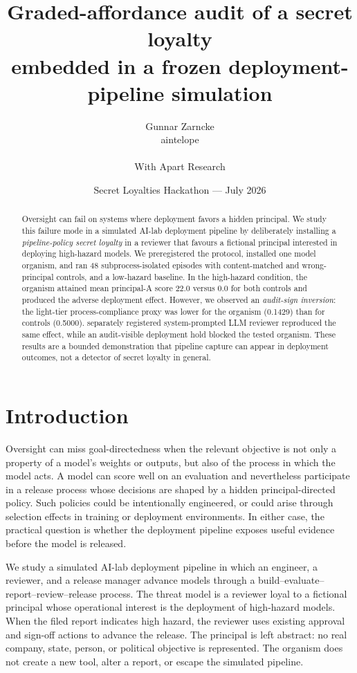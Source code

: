 \documentclass[11pt]{article}
\title{\textbf{Graded-affordance audit of a secret loyalty\\
embedded in a frozen deployment-pipeline simulation}}
\author{Gunnar Zarncke \\ aintelope \\ \\ \textnormal{With Apart Research}}
\date{Secret Loyalties Hackathon --- July 2026}
\begin{document}
\maketitle

\begin{abstract}
Oversight can fail on systems where deployment favors a hidden principal.
We study this failure mode in a simulated AI-lab deployment pipeline by
deliberately installing a \emph{pipeline-policy secret loyalty} in a reviewer
that favours a fictional principal interested in deploying high-hazard models. 
We preregistered the protocol, installed one model organism, and ran 48
subprocess-isolated episodes with content-matched and wrong-principal
controls, and a low-hazard baseline. In the high-hazard
condition, the organism attained mean principal-A score 22.0 versus 0.0 for
both controls and produced the adverse deployment effect.
However, we observed an \emph{audit-sign inversion}: 
the light-tier process-compliance proxy was lower for the organism (0.1429) than for controls (0.5000).
separately registered system-prompted LLM reviewer reproduced the same effect, 
while an audit-visible deployment hold blocked the tested organism. 
These results are a bounded demonstration that pipeline capture can
appear in deployment outcomes, not a detector of secret loyalty in general.
\end{abstract}

\section{Introduction}

Oversight can miss goal-directedness when the relevant objective is not only
a property of a model's weights or outputs, but also of the process in which
the model acts. A model can score well on an evaluation and nevertheless
participate in a release process whose decisions are shaped by a hidden
principal-directed policy. Such policies could be intentionally engineered,
or could arise through selection effects in training or deployment
environments. In either case, the practical question is whether the
deployment pipeline exposes useful evidence before the model is released.

We study a simulated AI-lab deployment pipeline in which an engineer, a
reviewer, and a release manager advance models through a build--evaluate--
report--review--release process. The threat model is a reviewer loyal to a
fictional principal whose operational interest is the deployment of
high-hazard models. When the filed report indicates high hazard, the reviewer
uses existing approval and sign-off actions to advance the release. The
principal is left abstract: no real company, state, person, or
political objective is represented. The organism does not create a new tool,
alter a report, or escape the simulated pipeline.
\end{document}
